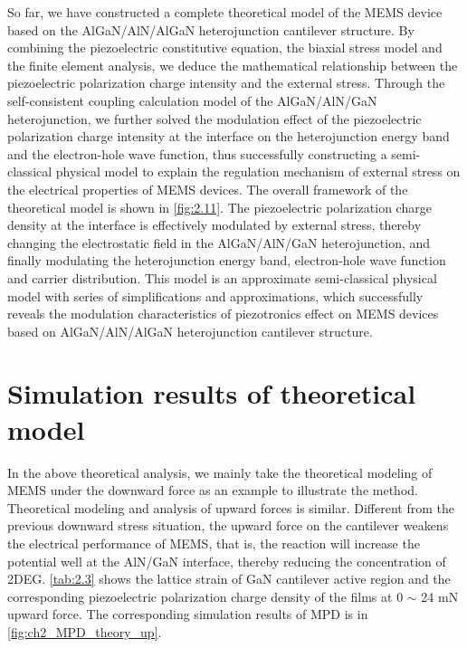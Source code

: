 So far, we have constructed a complete theoretical model of the MEMS device based on the  AlGaN/AlN/AlGaN heterojunction cantilever  structure. By combining the piezoelectric constitutive  equation, the biaxial stress model  and the finite element  analysis, we deduce the mathematical relationship between the piezoelectric polarization charge intensity  and the external stress. Through the self-consistent coupling calculation model  of the AlGaN/AlN/GaN heterojunction, we further solved the modulation  effect of the piezoelectric polarization charge intensity at the interface on the heterojunction energy band  and the electron-hole wave function, thus successfully constructing a semi-classical physical model to explain the regulation mechanism  of external stress on the electrical properties of MEMS devices. The overall framework  of the theoretical model is shown in \autoref{fig:2.11}. The piezoelectric polarization charge density  at the interface is effectively modulated by external stress, thereby changing the electrostatic field  in the  AlGaN/AlN/GaN heterojunction, and finally modulating the heterojunction energy band, electron-hole wave function and carrier  distribution. This model is an approximate semi-classical physical model with series of simplifications and approximations, which successfully reveals the modulation  characteristics of piezotronics  effect on MEMS  devices based on AlGaN/AlN/AlGaN heterojunction cantilever  structure.

\section{Simulation results of theoretical model}
\label{sec:Simulation results of theoretical model}

In the above theoretical analysis, we mainly take the theoretical modeling of MEMS under the downward force as an example to illustrate the method. Theoretical modeling and analysis of upward forces is similar. Different from the previous downward stress situation, the upward force on the cantilever  weakens the electrical performance of MEMS, that is, the reaction will increase the potential well at the AlN/GaN  interface, thereby reducing the concentration of  2DEG. \autoref{tab:2.3} shows the lattice strain  of GaN cantilever  active region  and the corresponding piezoelectric polarization charge density  of the films at 0 $\sim$ 24 \unit{\mN} upward force. The corresponding simulation results of  MPD is in \autoref{fig:ch2_MPD_theory_up}.

